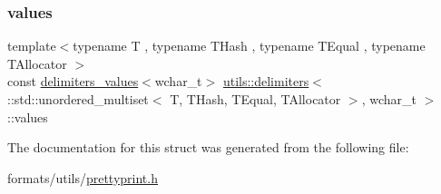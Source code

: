 \subsubsection{\texorpdfstring{values}{values}}
{\footnotesize\ttfamily template$<$typename T , typename T\+Hash , typename T\+Equal , typename T\+Allocator $>$ \\
const \mbox{\hyperlink{structutils_1_1delimiters__values}{delimiters\+\_\+values}}$<$wchar\+\_\+t$>$ \mbox{\hyperlink{structutils_1_1delimiters}{utils\+::delimiters}}$<$ \+::std\+::unordered\+\_\+multiset$<$ T, T\+Hash, T\+Equal, T\+Allocator $>$, wchar\+\_\+t $>$\+::values\hspace{0.3cm}{\ttfamily [static]}}



The documentation for this struct was generated from the following file\+:\begin{DoxyCompactItemize}
\item 
formats/utils/\mbox{\hyperlink{prettyprint_8h}{prettyprint.\+h}}\end{DoxyCompactItemize}
